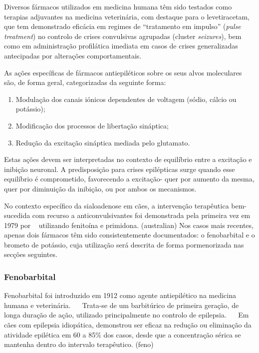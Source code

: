 Diversos fármacos utilizados em medicina humana têm sido testados como terapias adjuvantes na medicina veterinária, com destaque para o levetiracetam, que tem demonstrado eficácia em regimes de “tratamento em impulso” (\textit{pulse treatment}) no controlo de crises convulsivas agrupadas (cluster \textit{seizures}), bem como em administração profilática imediata em casos de crises generalizadas antecipadas por alterações comportamentais. 


As ações específicas de fármacos antiepiléticos sobre os seus alvos moleculares são, de forma geral, categorizadas da seguinte forma: ~\cite{Katzung2018}

\begin{enumerate}
    \item	Modulação dos canais iónicos dependentes de voltagem (sódio, cálcio ou potássio);
    \item Modificação dos processos de libertação sináptica;
    \item Redução da excitação sináptica mediada pelo glutamato.
\end{enumerate}

Estas ações devem ser interpretadas no contexto de equilíbrio entre a excitação e inibição neuronal. A predisposição para crises epilépticas surge quando esse equilíbrio é comprometido, favorecendo a excitação- quer por aumento da mesma, quer por diminuição da inibição, ou por ambos os mecanismos.~\cite{Katzung2018}


No contexto específico da sialoadenose em cães, a intervenção terapêutica bem-sucedida com recurso a anticonvulsivantes foi demonstrada pela primeira vez em 1979 por ~\cite{Kelly2017} utilizando fenitoína e primidona. (australian) Nos casos mais recentes, apenas dois fármacos têm sido consistentemente documentados: o fenobarbital e o brometo de potássio, cuja utilização será descrita de forma pormenorizada nas secções seguintes.


\subsubsection{Fenobarbital}


Fenobarbital foi introduzido em 1912 como agente antiepilético na medicina humana e veterinária. ~\cite{Yasiry2012}~\cite{Jukier2023} Trata-se de um barbitúrico de primeira geração, de longa duração de ação, utilizado principalmente no controlo de epilepsia. ~\cite{Papich2021}~\cite{Scott2021} Em cães com epilepsia idiopática, demonstrou ser eficaz na redução ou eliminação da atividade epilética em 60 a 85\% dos casos, desde que a concentração sérica se mantenha dentro do intervalo terapêutico. (feno)



